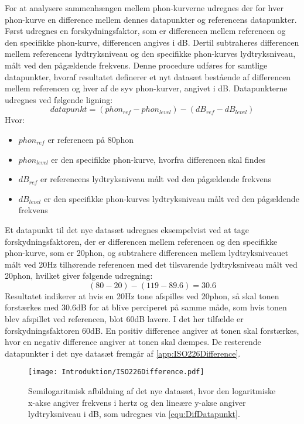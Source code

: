 For at analysere sammenhængen mellem phon-kurverne udregnes der for hver phon-kurve en difference mellem dennes datapunkter og referencens datapunkter. Først udregnes en forskydningsfaktor, som er differencen mellem referencen og den specifikke phon-kurve, differencen angives i dB. Dertil subtraheres differencen mellem referencens lydtryksniveau og den specifikke phon-kurves lydtryksniveau, målt ved den pågældende frekvens. Denne procedure udføres for samtlige datapunkter, hvoraf resultatet definerer et nyt datasæt bestående af differencen mellem referencen og hver af de syv phon-kurver, angivet i dB. Datapunkterne udregnes ved følgende ligning: 
%
\begin{equation}
	datapunkt=(phon_{ref}-phon_{level})-(dB_{ref}-dB_{level})
\label{equ:DifDatapunkt}
\end{equation}
\noindent
%
Hvor:
%
\begin{itemize}
	\item[] $phon_{ref}$ er referencen på 80phon
	\item[] $phon_{level}$ er den specifikke phon-kurve, hvorfra differencen skal findes
	\item[] $dB_{ref}$ er referencens lydtryksniveau målt ved den pågældende frekvens
	\item[] $dB_{level}$ er den specifikke phon-kurves lydtryksniveau målt ved den pågældende frekvens\\[5mm]
\end{itemize}
\noindent
%
Et datapunkt til det nye datasæt udregnes eksempelvist ved at tage forskydningsfaktoren, der er differencen mellem referencen og den specifikke phon-kurve, som er 20phon, og subtrahere differencen mellem lydtryksniveauet målt ved 20Hz tilhørende referencen med det tilsvarende lydtryksniveau målt ved 20phon, hvilket giver følgende udregning:
%
\begin{equation}
	(80-20)-(119-89.6)=30.6
\end{equation}      
\noindent
%
Resultatet indikerer at hvis en 20Hz tone afspilles ved 20phon, så skal tonen forstærkes med 30.6dB for at blive perciperet på samme måde, som hvis tonen blev afspillet ved referencen, blot 60dB lavere. I det her tilfælde er forskydningsfaktoren 60dB. En positiv difference angiver at tonen skal forstærkes, hvor en negativ difference angiver at tonen skal dæmpes. De resterende datapunkter i det nye datasæt fremgår af \autoref{app:ISO226Difference}.  
%
\begin{figure}[H]
	\centering
	\texttt{[image: Introduktion/ISO226Difference.pdf]}
	\caption{Semilogaritmisk afbildning af det nye datasæt, hvor den logaritmiske x-akse angiver frekvens i hertz og den lineære y-akse angiver lydtryksniveau i dB, som udregnes via \autoref{equ:DifDatapunkt}.}
	\label{fig:DifferenceKurver}
\end{figure}
